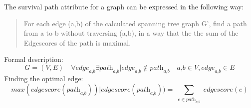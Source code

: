   The survival path attribute for a graph can be expressed in the following way:
  \begin{quote}
For each edge (a,b) of the calculated spanning tree graph G', find a path from a to b without traversing (a,b), 
in a way that the the sum of the Edgescores of the path is maximal.
  \end{quote}
  Formal description:
  $$\textit{G}=(\textit{V},\textit{E}) \quad
    \forall \textit{edge}_\textit{a,b} \exists \textit{path}_\textit{a,b} | \textit{edge}_\textit{a,b} \notin \textit{path}_\textit{a,b} \quad
    \textit{a,b} \in \textit{V}, \textit{edge}_\textit{a,b} \in \textit{E}$$
    Finding the optimal edge:
    $$\textit{max}(\textit{edgescore}(\textit{path}_\textit{a,b})) |
    \textit{edgescore}(\textit{path}_\textit{a,b})) = \sum_{\substack{e \in \textit{path}_\textit{a,b}}} \textit{edgescore}(e)$$

